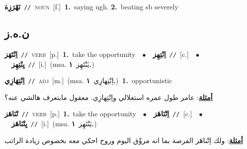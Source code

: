 \documentclass[10pt,a4paper,twoside]{article} %
\begin{document}
\begin{multicols}{2}
{\setlength\topsep{0pt}\textbf{\foreignlanguage{arabic}{نَهْرَزِة}}\ {\color{gray}\texttt{//}\color{black}}\ \textsc{noun}\ [f.]\ \textbf{1.}~saying ugh.  \textbf{2.}~beating sb severely\ } \vspace{2mm}

\vspace{-3mm}
\subsection*{\color{blue}\foreignlanguage{arabic}{ن.ه.ز}\color{blue}{}} 

{\setlength\topsep{0pt}\textbf{\foreignlanguage{arabic}{اِنْتَهَز}}\ {\color{gray}\texttt{//}\color{black}}\ \textsc{verb}\ [p.]\ \textbf{1.}~take the opportunity\ \ $\bullet$\ \ \setlength\topsep{0pt}\textbf{\foreignlanguage{arabic}{اِنْتِهِز}}\ {\color{gray}\texttt{//}\color{black}}\ [c.]\ \ $\bullet$\ \ \setlength\topsep{0pt}\textbf{\foreignlanguage{arabic}{يِنْتِهِز}}\ {\color{gray}\texttt{//}\color{black}}\ [i.]\ \color{gray}(msa. \foreignlanguage{arabic}{يَنْتَهِز}~\foreignlanguage{arabic}{\textbf{١.}})\color{black}\ } \vspace{2mm}

{\setlength\topsep{0pt}\textbf{\foreignlanguage{arabic}{اِنْتِهَازِي}}\ {\color{gray}\texttt{//}\color{black}}\ \textsc{adj}\ [m.]\ \color{gray}(msa. \foreignlanguage{arabic}{اِنْتِهازِي}~\foreignlanguage{arabic}{\textbf{١.}})\color{black}\ \textbf{1.}~opportunistic\  \begin{flushright}\color{gray}\foreignlanguage{arabic}{\textbf{\underline{\foreignlanguage{arabic}{أمثلة}}}: عامر طول عمره استغلالي واِنْتِهازِي. معقول مابتعرف هالشي عنه؟}\end{flushright}\color{black}} \vspace{2mm}

{\setlength\topsep{0pt}\textbf{\foreignlanguage{arabic}{تْنَاهَز}}\ {\color{gray}\texttt{//}\color{black}}\ \textsc{verb}\ [p.]\ \textbf{1.}~take the opportunity\ \ $\bullet$\ \ \setlength\topsep{0pt}\textbf{\foreignlanguage{arabic}{اِتْنَاهَز}}\ {\color{gray}\texttt{//}\color{black}}\ [c.]\ \ $\bullet$\ \ \setlength\topsep{0pt}\textbf{\foreignlanguage{arabic}{يِتْنَاهَز}}\ {\color{gray}\texttt{//}\color{black}}\ [i.]\ \color{gray}(msa. \foreignlanguage{arabic}{يَنْتَهِز}~\foreignlanguage{arabic}{\textbf{١.}})\color{black}\  \begin{flushright}\color{gray}\foreignlanguage{arabic}{\textbf{\underline{\foreignlanguage{arabic}{أمثلة}}}: ولك اِتْناهَز الفرصة بما انه مروِّق اليوم وروح احكي معه بخصوص زيادة الراتب}\end{flushright}\color{black}} \vspace{2mm}


\end{multicols}
\end{document}
